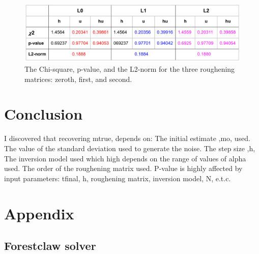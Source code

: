 \documentclass[12pt,a4paper]{article}
\begin{document}
	\begin{figure}[H]
	\centering
	\includegraphics[width=0.5\linewidth]{con}
	\caption{ The Chi-square, p-value, and the L2-norm for the three roughening matrices: zeroth, first, and second. }
	\label{fig:confidence}
\end{figure}
	\section{Conclusion}
	I discovered that recovering mtrue, depends on:
	The initial estimate ,mo, used.
	The value of the standard deviation used to generate the noise.
	The step size ,h,
	The inversion model used which high depends on the range of values of alpha used.
	The order of  the roughening matrix used.
	P-value is highly affected by input parameters: tfinal, h, roughening matrix, inversion model, N, e.t.c.
	


	

	
	\section{Appendix}
	
	
	\subsection{Forestclaw solver}
	\begingroup\makeatletter{} 	\label{exact}
	\verbatim
	
\end{document}
